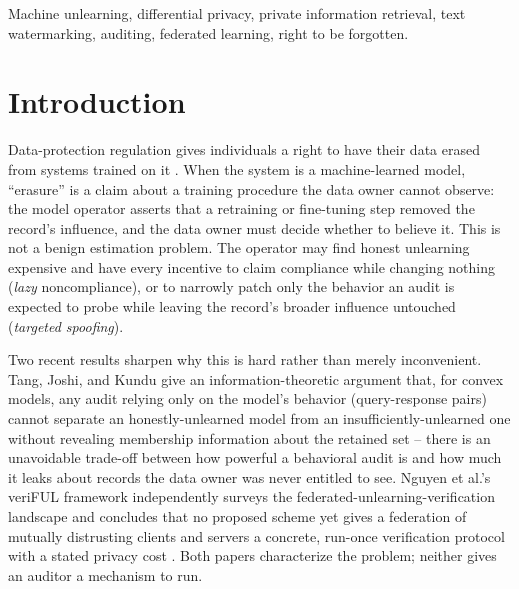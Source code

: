\documentclass[10pt,journal,compsoc]{IEEEtran}
\begin{document}
\begin{abstract}
uniform query suppression provably drives the true signal to exactly zero (Proposition~\ref{prop:zerodiv}); a harder, resource-bounded variant of the same attack that does not carry this guarantee is caught only 20\% of the time, against a 40\% analytic ceiling, and we report that weaker number alongside the strong one rather than only the flattering case. Experiments on federated logistic regression over UCI German Credit, MNIST, and a 150{,}000-row Forest Covertype subsample, and on a real fine-tuned language model audited over the real TOFU fictitious-author benchmark, report both power and honestly-measured failure modes at small calibration-sample sizes, rather than tuning them away.
\end{abstract}

\begin{IEEEkeywords}
Machine unlearning, differential privacy, private information retrieval, text watermarking, auditing, federated learning, right to be forgotten.
\end{IEEEkeywords}

\section{Introduction}

Data-protection regulation gives individuals a right to have their data erased from systems trained on it \cite{gdpr2016}. When the system is a machine-learned model, ``erasure'' is a claim about a training procedure the data owner cannot observe: the model operator asserts that a retraining or fine-tuning step removed the record's influence, and the data owner must decide whether to believe it. This is not a benign estimation problem. The operator may find honest unlearning expensive and have every incentive to claim compliance while changing nothing (\emph{lazy} noncompliance), or to narrowly patch only the behavior an audit is expected to probe while leaving the record's broader influence untouched (\emph{targeted spoofing}).

Two recent results sharpen why this is hard rather than merely inconvenient. Tang, Joshi, and Kundu give an information-theoretic argument that, for convex models, any audit relying only on the model's behavior (query-response pairs) cannot separate an honestly-unlearned model from an insufficiently-unlearned one without revealing membership information about the retained set \cite{tang2026geometric} -- there is an unavoidable trade-off between how powerful a behavioral audit is and how much it leaks about records the data owner was never entitled to see. Nguyen et al.'s veriFUL framework independently surveys the federated-unlearning-verification landscape and concludes that no proposed scheme yet gives a federation of mutually distrusting clients and servers a concrete, run-once verification protocol with a stated privacy cost \cite{nguyen2025veriful}. Both papers characterize the problem; neither gives an auditor a mechanism to run.
\end{document}
